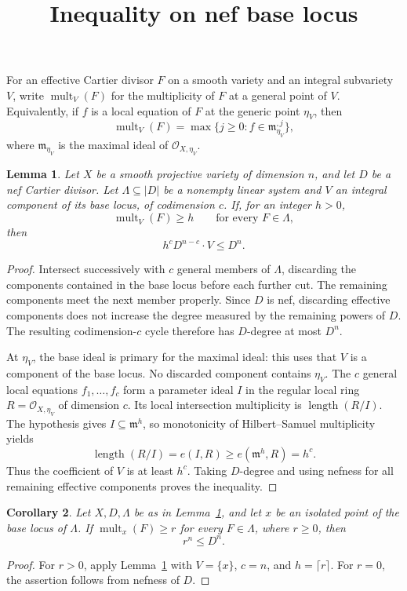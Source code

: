 \documentclass[12pt,a4paper,psamsfonts]{amsart}
\title{Inequality on nef base locus}
\date{}
\newtheorem{lemma}{Lemma}
\newtheorem{corollary}[lemma]{Corollary}
\DeclareMathOperator{\mult}{mult}
\begin{document}
\maketitle

For an effective Cartier divisor $F$ on a smooth variety and an
integral subvariety $V$, write $\mult_V(F)$ for the multiplicity
of $F$ at a general point of $V$. Equivalently, if $f$ is a local
equation of $F$ at the generic point $\eta_V$, then
\[
 \mult_V(F)=\max\{j\ge0:f\in\mathfrak m_{\eta_V}^{,j}\},
\]
where $\mathfrak m_{\eta_V}$ is the maximal ideal of
$\mathcal O_{X,\eta_V}$.

\begin{lemma}\label{lem:base-degree}
Let $X$ be a smooth projective variety of dimension $n$, and let
$D$ be a nef Cartier divisor. Let $\Lambda\subseteq|D|$ be a
nonempty linear system and $V$ an integral component of its base
locus, of codimension $c$. If, for an integer $h>0$,
\[
 \mult_V(F)\ge h\qquad\text{for every }F\in\Lambda,
\]
then
\[
 h^cD^{n-c}\cdot V\le D^n.
\]
\end{lemma}
\begin{proof}
Intersect successively with $c$ general members of $\Lambda$,
discarding the components contained in the base locus before
each further cut. The remaining components meet the next member
properly. Since $D$ is nef, discarding effective components does
not increase the degree measured by the remaining powers of $D$.
The resulting codimension-$c$ cycle therefore has $D$-degree at
most $D^n$.

At $\eta_V$, the base ideal is primary for the maximal ideal:
this uses that $V$ is a component of the base locus. No discarded
component contains $\eta_V$. The $c$ general local equations
$f_1,\ldots,f_c$ form a parameter ideal $I$ in the regular local
ring $R=\mathcal O_{X,\eta_V}$ of dimension $c$. Its local
intersection multiplicity is $\operatorname{length}(R/I)$.
The hypothesis gives $I\subseteq\mathfrak m^h$, so monotonicity
of Hilbert--Samuel multiplicity yields
\[
 \operatorname{length}(R/I)=e(I,R)
 \ge e(\mathfrak m^h,R)=h^c.
\]
Thus the coefficient of $V$ is at least $h^c$. Taking $D$-degree
and using nefness for all remaining effective components proves
the inequality.
\end{proof}

\begin{corollary}\label{cor:isolated-point}
Let $X,D,\Lambda$ be as in Lemma~\ref{lem:base-degree}, and let
$x$ be an isolated point of the base locus of $\Lambda$.
If $\mult_x(F)\ge r$ for every $F\in\Lambda$, where $r\ge0$, then
\[
 r^n\le D^n.
\]
\end{corollary}
\begin{proof}
For $r>0$, apply Lemma~\ref{lem:base-degree} with
$V=\{x\}$, $c=n$, and $h=\lceil r\rceil$.
For $r=0$, the assertion follows from nefness of $D$.
\end{proof}
\end{document}
